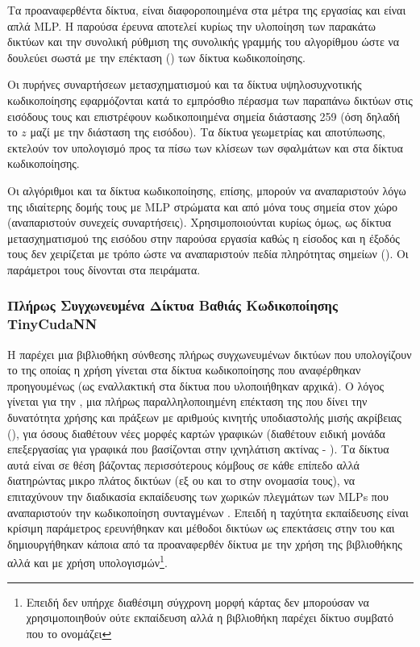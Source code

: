     Τα προαναφερθέντα δίκτυα, είναι διαφοροποιημένα στα μέτρα της εργασίας και είναι απλά MLP. Η παρούσα έρευνα αποτελεί κυρίως την υλοποίηση των παρακάτω δικτύων και την συνολική ρύθμιση της συνολικής γραμμής του αλγορίθμου ώστε να δουλεύει σωστά με την επέκταση () των δίκτυα κωδικοποίησης.

    Οι πυρήνες συναρτήσεων μετασχηματισμού και τα δίκτυα υψηλοσυχνοτικής κωδικοποίησης εφαρμόζονται κατά το εμπρόσθιο πέρασμα των παραπάνω δικτύων στις εισόδους τους και επιστρέφουν κωδικοποιημένα σημεία διάστασης 259 (όση δηλαδή το  $z$ μαζί με την διάσταση της εισόδου). Τα δίκτυα γεωμετρίας και αποτύπωσης, εκτελούν τον υπολογισμό προς τα πίσω  των κλίσεων των σφαλμάτων και στα δίκτυα κωδικοποίησης. 

     Οι αλγόριθμοι και τα δίκτυα κωδικοποίησης, επίσης, μπορούν να αναπαριστούν λόγω της ιδιαίτερης δομής τους με MLP στρώματα και από μόνα τους σημεία στον χώρο (αναπαριστούν συνεχείς συναρτήσεις). Χρησιμοποιούνται κυρίως όμως, ως δίκτυα μετασχηματισμού της εισόδου στην παρούσα εργασία καθώς η είσοδος και η έξοδός τους δεν χειρίζεται με τρόπο ώστε να αναπαριστούν πεδία πληρότητας σημείων ().  Οι παράμετροι  τους δίνονται στα πειράματα.

\subsubsection{Πλήρως Συγχωνευμένα Δίκτυα Βαθιάς Κωδικοποίησης TinyCudaNN}
    H  παρέχει μια βιβλιοθήκη σύνθεσης πλήρως συγχωνευμένων δικτύων  που υπολογίζουν το  της οποίας η χρήση γίνεται στα δίκτυα κωδικοποίησης που αναφέρθηκαν προηγουμένως (ως εναλλακτική στα δίκτυα που υλοποιήθηκαν αρχικά). Ο λόγος γίνεται για την \cite{tinycudann}, μια πλήρως παραλληλοποιημένη επέκταση της  που δίνει την δυνατότητα χρήσης και πράξεων με αριθμούς κινητής υποδιαστολής μισής ακρίβειας (), για όσους διαθέτουν νέες μορφές καρτών γραφικών (διαθέτουν ειδική μονάδα επεξεργασίας για γραφικά που βασίζονται στην ιχνηλάτιση ακτίνας - ). Τα δίκτυα αυτά είναι σε θέση βάζοντας περισσότερους κόμβους σε κάθε επίπεδο αλλά διατηρώντας μικρο πλάτος δικτύων (εξ ου και το  στην ονομασία τους), να επιταχύνουν την διαδικασία εκπαίδευσης των χωρικών πλεγμάτων των MLPs που αναπαριστούν την κωδικοποίηση συνταγμένων . Επειδή η ταχύτητα εκπαίδευσης είναι κρίσιμη παράμετρος ερευνήθηκαν και μέθοδοι  δικτύων ως  επεκτάσεις στην  του  και δημιουργήθηκαν κάποια από τα προαναφερθέν δίκτυα με την χρήση της βιβλιοθήκης αλλά και με χρήση  υπολογισμών\footnote{Επειδή δεν υπήρχε διαθέσιμη σύγχρονη μορφή κάρτας δεν μπορούσαν να χρησιμοποιηθούν  ούτε  εκπαίδευση αλλά η βιβλιοθήκη παρέχει δίκτυο συμβατό που το ονομάζει }.

    

